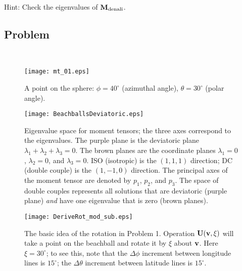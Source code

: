 \documentclass[11pt,titlepage,fleqn]{article}
\newcommand{\rotangB}{\xi}    %
\newcommand{\rotvec}{\bv}      %
\begin{document}
\begin{enumerate}
\begin{enumerate}
Hint: Check the eigenvalues of $\mbox{${\bf M}$}_{\rm denali}$.


\end{enumerate}

\end{enumerate}


\subsection*{Problem} \howmuchtime\




\begin{figure}[h]
\centering
\texttt{[image: mt\_01.eps]}
\caption[]
{{
A point on the sphere: $\phi = 40^\circ$ (azimuthal angle), $\theta = 30^\circ$ (polar angle).
\label{fig:globe}
}}
\end{figure}

\clearpage\pagebreak
\begin{figure}
\centering
\texttt{[image: BeachballsDeviatoric.eps]}
\caption[]
{{
Eigenvalue space for moment tensors; the three axes correspond to the eigenvalues.
The purple plane is the deviatoric plane $\lambda_1 + \lambda_2 + \lambda_3 = 0$.
The brown planes are the coordinate planes $\lambda_1 = 0$, $\lambda_2 = 0$, and $\lambda_3 = 0$.
ISO (isotropic) is the $(1,1,1)$ direction; DC (double couple) is the $(1,-1,0)$ direction.
The principal axes of the moment tensor are denoted by $p_1$, $p_2$, and $p_3$.
 The space of double couples represents all solutions that are deviatoric (purple plane) {\em and} have one eigenvalue that is zero (brown planes).
\label{fig:lam}
}}
\end{figure}

\begin{figure}
\centering
\texttt{[image: DeriveRot\_mod\_sub.eps]}
\caption[]
{{
The basic idea of the rotation in Problem 1.
Operation $\bU(\rotvec,\rotangB)$ will take a point on the beachball and rotate it by $\rotangB$ about $\rotvec$.
Here $\rotangB = 30^\circ$; to see this, note that the $\Delta\phi$ increment between longitude lines is $15^\circ$; the $\Delta\theta$ increment between latitude lines is $15^\circ$.
\label{fig:rotsub}
}}
\end{figure}
\end{document}

